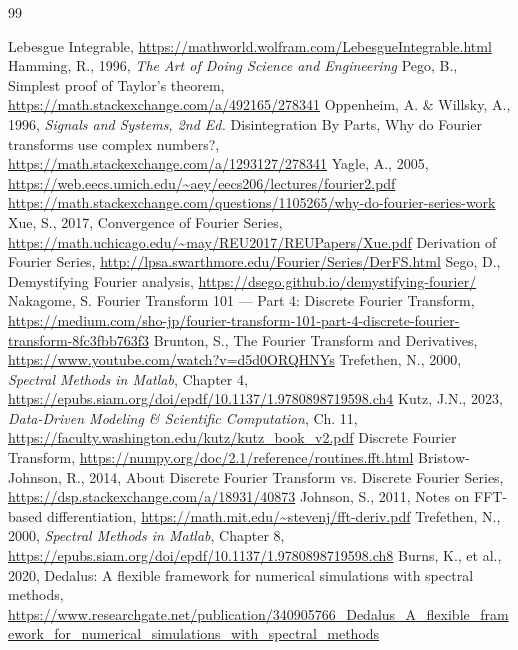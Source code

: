 \documentclass[10pt]{article}
\begin{document}
\begin{thebibliography}{99} %
\raggedright\small
{}\setlength{\itemsep}{-2pt}
	Lebesgue Integrable, \url{https://mathworld.wolfram.com/LebesgueIntegrable.html}
	Hamming, R., 1996, \textit{The Art of Doing Science and Engineering}
	Pego, B., Simplest proof of Taylor's theorem, \url{https://math.stackexchange.com/a/492165/278341}
	Oppenheim, A. \& Willsky, A., 1996, \textit{Signals and Systems, 2nd Ed.}
	Disintegration By Parts, Why do Fourier transforms use complex numbers?, \url{https://math.stackexchange.com/a/1293127/278341}
	Yagle, A., 2005, \url{https://web.eecs.umich.edu/~aey/eecs206/lectures/fourier2.pdf}
	\url{https://math.stackexchange.com/questions/1105265/why-do-fourier-series-work}
	Xue, S., 2017, Convergence of Fourier Series, \url{https://math.uchicago.edu/~may/REU2017/REUPapers/Xue.pdf}
	Derivation of Fourier Series, \url{http://lpsa.swarthmore.edu/Fourier/Series/DerFS.html}
	Sego, D., Demystifying Fourier analysis, \url{https://dsego.github.io/demystifying-fourier/}
	Nakagome, S. Fourier Transform 101 — Part 4: Discrete Fourier Transform, \url{https://medium.com/sho-jp/fourier-transform-101-part-4-discrete-fourier-transform-8fc3fbb763f3}
	Brunton, S., The Fourier Transform and Derivatives, \url{https://www.youtube.com/watch?v=d5d0ORQHNYs}
	Trefethen, N., 2000, \textit{Spectral Methods in Matlab}, Chapter 4, \url{https://epubs.siam.org/doi/epdf/10.1137/1.9780898719598.ch4}
	Kutz, J.N., 2023, \textit{Data-Driven Modeling \& Scientific Computation}, Ch. 11, \url{https://faculty.washington.edu/kutz/kutz_book_v2.pdf}
	Discrete Fourier Transform, \url{https://numpy.org/doc/2.1/reference/routines.fft.html}
	Bristow-Johnson, R., 2014, About Discrete Fourier Transform vs. Discrete Fourier Series, \url{https://dsp.stackexchange.com/a/18931/40873}
	Johnson, S., 2011, Notes on FFT-based differentiation, \url{https://math.mit.edu/~stevenj/fft-deriv.pdf}
	Trefethen, N., 2000, \textit{Spectral Methods in Matlab}, Chapter 8, \url{https://epubs.siam.org/doi/epdf/10.1137/1.9780898719598.ch8}	
	Burns, K., et al., 2020, Dedalus: A flexible framework for numerical simulations with spectral methods, \url{https://www.researchgate.net/publication/340905766_Dedalus_A_flexible_framework_for_numerical_simulations_with_spectral_methods}

\end{thebibliography}
\end{document}
